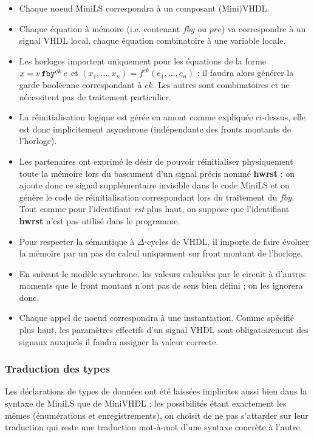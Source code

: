 \documentclass[a4paper]{article}
\newcommand{\mybox}[1]{\mbox{\tt{#1}}}
\newcommand{\Fby}[2]{#1 \, \mybox{fby}^{ck} \, #2}
\newcommand{\App}[2]{#1^{ck}(#2)}
\begin{document}
\begin{itemize}
\item Chaque noeud MiniLS correspondra \`a un composant (Mini)VHDL.
\item Chaque \'equation \`a m\'emoire (i.e. contenant $fby$ ou $pre$) va correspondre
  \`a un signal VHDL local, chaque \'equation combinatoire \`a une variable locale.
\item Les horloges importent uniquement pour les \'equations de la forme $x =
  \Fby{v}{e}$ et $(x_1,\dots,x_n) = \App{f}{e_1,\dots,e_n}$ : il faudra alors
  g\'en\'erer la garde bool\'eenne correspondant \`a $ck$. Les autres sont combinatoires
  et ne n\'ecessitent pas de traitement particulier.
\item La r\'einitialisation logique est g\'er\'ee en amont comme expliqu\'ee ci-dessus,
  elle est donc implicitement asynchrone (ind\'ependante des fronts montants de
  l'horloge).
\item Les partenaires ont exprim\'e le d\'esir de pouvoir r\'einitialiser
  physiquement toute la m\'emoire lors du bascument d'un signal pr\'ecis nomm\'e
  \textbf{hwrst} : on ajoute donc ce signal suppl\'ementaire invisible dans le
  code MiniLS et on g\'en\`ere le code de r\'einitialisation correspondant lors
  du traitement du $fby$. Tout comme pour l'identifiant \textit{rst} plus haut, on suppose que l'identifiant \textbf{hwrst} n'est pas utilis\'e dans le programme.
\item Pour respecter la s\'emantique \`a $\Delta$-cycles de VHDL, il importe de
  faire \'evoluer la m\'emoire par un pas du calcul uniquement sur front montant de
  l'horloge.
\item En suivant le mod\`ele synchrone, les valeurs calcul\'ees par le circuit \`a
  d'autres moments que le front montant n'ont pas de sens bien d\'efini ; on les
  ignorera donc.
\item Chaque appel de noeud correspondra \`a une instantiation. Comme sp\'ecifi\'e
  plus haut, les param\`etres effectifs d'un signal VHDL sont obligatoirement des
  signaux auxquels il faudra assigner la valeur correcte.
\end{itemize}

\subsubsection{Traduction des types}

Les d\'eclarations de types de donn\'ees ont \'et\'e laiss\'ees implicites aussi bien dans
la syntaxe de MiniLS que de MiniVHDL ; les possibilit\'es \'etant exactement les
m\^emes (\'enum\'erations et enregistrements), on choisit de ne pas s'attarder sur
leur traduction qui reste une traduction mot-\`a-mot d'une syntaxe concr\`ete \`a
l'autre.
\end{document}
